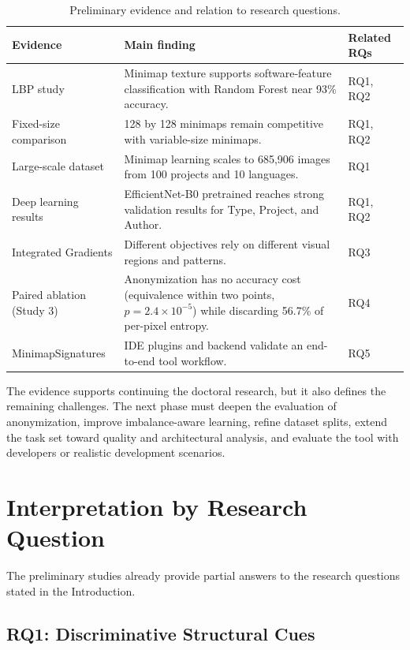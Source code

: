 \begin{table}[ht]
\centering
\caption{Preliminary evidence and relation to research questions.}
\label{tab:preliminary-evidence}
\begin{tabular}{p{}p{}p{}}
\toprule
\textbf{Evidence} & \textbf{Main finding} & \textbf{Related RQs} \\
\midrule
LBP study & Minimap texture supports software-feature classification with Random Forest near 93\% accuracy. & RQ1, RQ2 \\
Fixed-size comparison & 128 by 128 minimaps remain competitive with variable-size minimaps. & RQ1, RQ2 \\
Large-scale dataset & Minimap learning scales to 685,906 images from 100 projects and 10 languages. & RQ1 \\
Deep learning results & EfficientNet-B0 pretrained reaches strong validation results for Type, Project, and Author. & RQ1, RQ2 \\
Integrated Gradients & Different objectives rely on different visual regions and patterns. & RQ3 \\
Paired ablation (Study 3) & Anonymization has no accuracy cost (equivalence within two points, $p = 2.4 \times 10^{-5}$) while discarding 56.7\% of per-pixel entropy. & RQ4 \\
MinimapSignatures & IDE plugins and backend validate an end-to-end tool workflow. & RQ5 \\
\bottomrule
\end{tabular}
\fautor
\end{table}

The evidence supports continuing the doctoral research, but it also defines the
remaining challenges. The next phase must deepen the evaluation of
anonymization, improve imbalance-aware learning, refine dataset splits, extend
the task set toward quality and architectural analysis, and evaluate the tool
with developers or realistic development scenarios.

\section{Interpretation by Research Question}

The preliminary studies already provide partial answers to the research
questions stated in the Introduction.

\subsection{RQ1: Discriminative Structural Cues}

